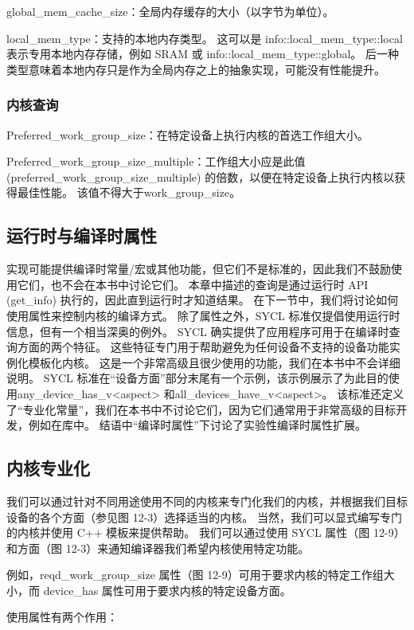 global\_mem\_cache\_size：全局内存缓存的大小（以字节为单位）。 

local\_mem\_type：支持的本地内存类型。 这可以是 info::local\_mem\_type::local 表示专用本地内存存储，例如 SRAM 或 info::local\_mem\_type::global。 后一种类型意味着本地内存只是作为全局内存之上的抽象实现，可能没有性能提升。

\subsubsection{内核查询}
Preferred\_work\_group\_size：在特定设备上执行内核的首选工作组大小。

Preferred\_work\_group\_size\_multiple：工作组大小应是此值 (preferred\_work\_group\_size\_multiple) 的倍数，以便在特定设备上执行内核以获得最佳性能。 该值不得大于work\_group\_size。

\subsection{运行时与编译时属性}
实现可能提供编译时常量/宏或其他功能，但它们不是标准的，因此我们不鼓励使用它们，也不会在本书中讨论它们。 本章中描述的查询是通过运行时 API (get\_info) 执行的，因此直到运行时才知道结果。 在下一节中，我们将讨论如何使用属性来控制内核的编译方式。 除了属性之外，SYCL 标准仅提倡使用运行时信息，但有一个相当深奥的例外。 SYCL 确实提供了应用程序可用于在编译时查询方面的两个特征。 这些特征专门用于帮助避免为任何设备不支持的设备功能实例化模板化内核。 这是一个非常高级且很少使用的功能，我们在本书中不会详细说明。 SYCL 标准在“设备方面”部分末尾有一个示例，该示例展示了为此目的使用any\_device\_has\_v<aspect> 和all\_devices\_have\_v<aspect>。 该标准还定义了“专业化常量”，我们在本书中不讨论它们，因为它们通常用于非常高级的目标开发，例如在库中。 结语中“编译时属性”下讨论了实验性编译时属性扩展。

\subsection{内核专业化}
我们可以通过针对不同用途使用不同的内核来专门化我们的内核，并根据我们目标设备的各个方面（参见图 12-3）选择适当的内核。 当然，我们可以显式编写专门的内核并使用 C++ 模板来提供帮助。 我们可以通过使用 SYCL 属性（图 12-9）和方面（图 12-3）来通知编译器我们希望内核使用特定功能。

例如，reqd\_work\_group\_size 属性（图 12-9）可用于要求内核的特定工作组大小，而 device\_has 属性可用于要求内核的特定设备方面。

使用属性有两个作用：

